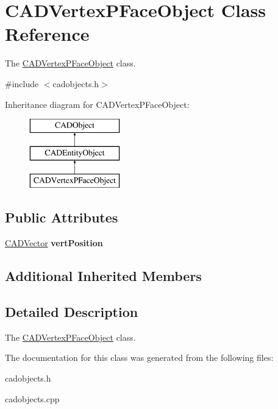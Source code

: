 \hypertarget{class_c_a_d_vertex_p_face_object}{}\section{C\+A\+D\+Vertex\+P\+Face\+Object Class Reference}
\label{class_c_a_d_vertex_p_face_object}


The \hyperlink{class_c_a_d_vertex_p_face_object}{C\+A\+D\+Vertex\+P\+Face\+Object} class.  




{\ttfamily \#include $<$cadobjects.\+h$>$}

Inheritance diagram for C\+A\+D\+Vertex\+P\+Face\+Object\+:\begin{figure}[H]
\begin{center}
\leavevmode
\includegraphics[height=3.000000cm]{class_c_a_d_vertex_p_face_object}
\end{center}
\end{figure}
\subsection*{Public Attributes}
\begin{DoxyCompactItemize}
\item 
\hyperlink{class_c_a_d_vector}{C\+A\+D\+Vector} {\bfseries vert\+Position}\hypertarget{class_c_a_d_vertex_p_face_object_af9339c075dcd3cda95a2321415815f54}{}\label{class_c_a_d_vertex_p_face_object_af9339c075dcd3cda95a2321415815f54}

\end{DoxyCompactItemize}
\subsection*{Additional Inherited Members}


\subsection{Detailed Description}
The \hyperlink{class_c_a_d_vertex_p_face_object}{C\+A\+D\+Vertex\+P\+Face\+Object} class. 

The documentation for this class was generated from the following files\+:\begin{DoxyCompactItemize}
\item 
cadobjects.\+h\item 
cadobjects.\+cpp\end{DoxyCompactItemize}
